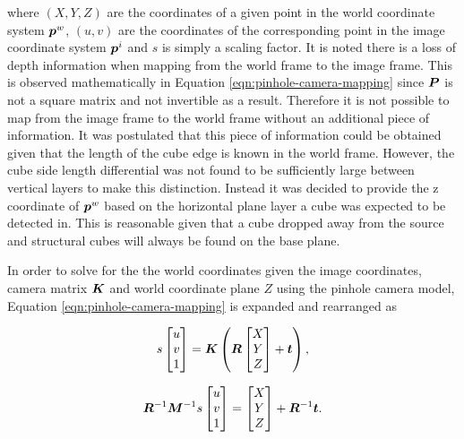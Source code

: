 where $(X,Y,Z)$ are the coordinates of a given point in the world coordinate system $\bm{p}^w$, $(u,v)$ are the coordinates of the corresponding point in the image coordinate system $\bm{p}^i$ and $s$ is simply a scaling factor. It is noted there is a loss of depth information when mapping from the world frame to the image frame. This is observed mathematically in Equation \ref{eqn:pinhole-camera-mapping} since $\bm{P}$ is not a square matrix and not invertible as a result. Therefore it is not possible to map from the image frame to the world frame without an additional piece of information. It was postulated that this piece of information could be obtained given that the length of the cube edge is known in the world frame. However, the cube side length differential was not found to be sufficiently large between vertical layers to make this distinction. Instead it was decided to provide the z coordinate of $\bm{p}^w$ based on the horizontal plane layer a cube was expected to be detected in. This is reasonable given that a cube dropped away from the source and structural cubes will always be found on the base plane.

In order to solve for the the world coordinates given the image coordinates, camera matrix $\bm{K}$ and world coordinate plane $Z$ using the pinhole camera model, Equation \ref{eqn:pinhole-camera-mapping} is expanded and rearranged as

\begin{equation}
	s
	\begin{bmatrix}
		u \\ 
		v \\ 
		1
	\end{bmatrix}
	=
	\bm{K}\left(\bm{R}
	\begin{bmatrix}
		X \\ 
		Y \\ 
		Z
	\end{bmatrix}
	+ \bm{t}\right),
	\label{eqn:expanded-pinhole-camera-mapping1}
\end{equation}

\begin{equation}
	\bm{R}^{-1}\bm{M}^{-1}
	s
	\begin{bmatrix}
		u \\ 
		v \\ 
		1
	\end{bmatrix}
	=
	\begin{bmatrix}
		X \\ 
		Y \\ 
		Z
	\end{bmatrix}
	+ \bm{R}^{-1}\bm{t}.
	\label{eqn:expanded-pinhole-camera-mapping2}
\end{equation}

